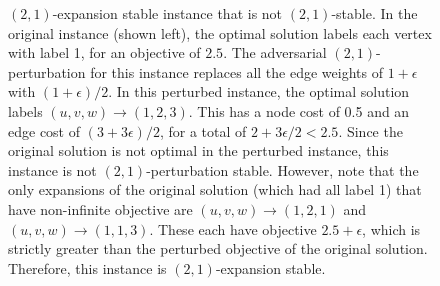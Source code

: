 \begin{figure}[tb]
  \centering
\begin{subfigure}{.5\linewidth}
  \centering
\end{subfigure}%
\begin{subfigure}{.5\linewidth}
  \centering
\end{subfigure}
  \caption{$(2,1)$-expansion stable instance that is not $(2,1)$-stable. In the original instance (shown left), the optimal solution labels each vertex with label 1, for an objective of $2.5$. The adversarial $(2,1)$-perturbation for this instance replaces all the edge weights of $1+\epsilon$ with $(1+\epsilon)/2$. In this perturbed instance, the optimal solution labels $(u,v,w) \rightarrow (1,2,3)$. This has a node cost of 0.5 and an edge cost of $(3+3\epsilon)/2$, for a total of $2+3\epsilon/2 < 2.5$. Since the original solution is not optimal in the perturbed instance, this instance is not $(2,1)$-perturbation stable. However, note that the only expansions of the original solution (which had all label 1) that have non-infinite objective are $(u,v,w) \rightarrow (1,2,1)$ and $(u,v,w) \rightarrow (1,1,3)$. These each have objective $2.5 + \epsilon$, which is strictly greater than the perturbed objective of the original solution. Therefore, this instance is $(2,1)$-expansion stable.}
\label{fig:counter1-apdx}
\end{figure}


